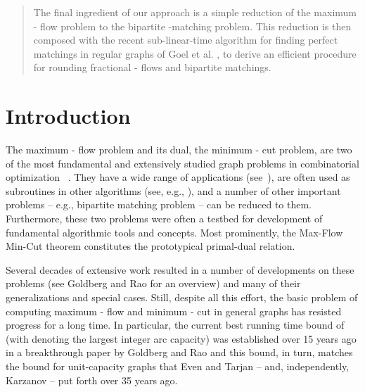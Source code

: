 \documentclass[11pt, letterpaper]{article}
\begin{document}
\begin{abstract}
The final ingredient of our approach is a simple reduction of the maximum - flow problem to the bipartite -matching problem. This reduction is then composed with the recent sub-linear-time algorithm for finding perfect matchings in regular graphs of Goel et al. \cite{GoelKK10}, to derive an efficient procedure for rounding fractional - flows and bipartite matchings. 

 

\end{abstract}

\thispagestyle{empty}
\newpage
\setcounter{page}{1}







\section{Introduction}


  The maximum - flow problem and its dual, the minimum - cut problem,
  are two of the most fundamental and extensively studied graph problems in combinatorial optimization ~\cite{Schrijver03,AhujaMO93}. They have a wide range of applications (see~\cite{AhujaMOR95}), are often used as subroutines in other algorithms (see, e.g., \cite{AroraHK05,Sherman09}), and a number of other important problems  -- e.g., bipartite matching problem \cite{CormenLRS09} -- can be reduced to them.  Furthermore, these two problems were often a testbed for development of fundamental algorithmic tools and concepts. Most prominently, the Max-Flow Min-Cut theorem \cite{EliasFS56,FordF56} constitutes the prototypical primal-dual relation.
  
  Several decades of extensive work resulted in a number of developments on these problems (see Goldberg and Rao \cite{GoldbergR98} for an overview) and  many of their generalizations and special cases. Still, despite all this effort, the basic problem of computing maximum - flow and minimum - cut in general graphs has resisted progress for a long time. In particular, the current best running time bound of  (with  denoting the largest integer arc capacity) was established over 15 years ago in a breakthrough paper by Goldberg and Rao \cite{GoldbergR98} and this bound, in turn, matches the  bound for unit-capacity graphs that Even and Tarjan \cite{EvenT75} -- and, independently, Karzanov \cite{Karzanov73} -- put forth over 35 years ago. 
  
\end{document}
